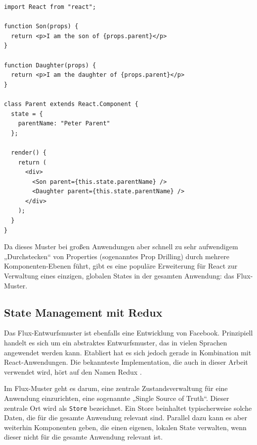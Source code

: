 \begin{minipage}{\linewidth}
\begin{lstlisting}[caption={„Lifting state up“: Mehrere Komponenten greifen auf die gleichen Daten zu.}]
import React from "react";

function Son(props) {
  return <p>I am the son of {props.parent}</p>
}

function Daughter(props) {
  return <p>I am the daughter of {props.parent}</p>
}

class Parent extends React.Component {
  state = {
    parentName: "Peter Parent"
  };

  render() {
    return (
      <div>
        <Son parent={this.state.parentName} />
        <Daughter parent={this.state.parentName} />
      </div>
    );
  }
}
\end{lstlisting}
\end{minipage}

Da dieses Muster bei großen Anwendungen aber schnell zu sehr aufwendigem „Durchstecken“ von Properties (sogenanntes Prop Drilling) durch mehrere Komponenten-Ebenen führt, gibt es eine populäre Erweiterung für React zur Verwaltung eines einzigen, globalen States in der gesamten Anwendung: das Flux-Muster\cite{web:flux_doku}.


\subsection{State Management mit Redux}
\label{chap:redux_state_management}
Das Flux-Entwurfsmuster ist ebenfalls eine Entwicklung von Facebook. Prinzipiell handelt es sich um ein abstraktes Entwurfsmuster, das in vielen Sprachen angewendet werden kann. Etabliert hat es sich jedoch gerade in Kombination mit React-Anwendungen. Die bekannteste Implementation, die auch in dieser Arbeit verwendet wird, hört auf den Namen Redux \cite{web:redux}.

Im Flux-Muster geht es darum, eine zentrale Zustandsverwaltung für eine Anwendung einzurichten, eine sogenannte „Single Source of Truth“. Dieser zentrale Ort wird als \texttt{Store} bezeichnet. Ein Store beinhaltet typischerweise solche Daten, die für die gesamte Anwendung relevant sind. Parallel dazu kann es aber weiterhin Komponenten geben, die einen eigenen, lokalen State verwalten, wenn dieser nicht für die gesamte Anwendung relevant ist.

